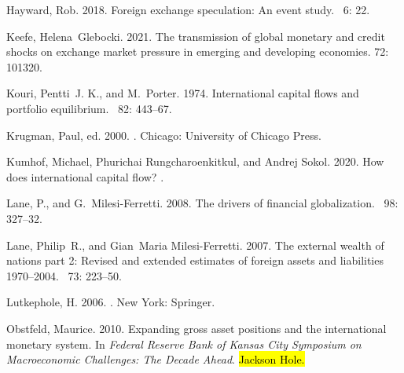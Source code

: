 \documentclass[jrfm,article,accept,moreauthors,pdftex]{Definitions/mdpi}
\begin{document}
\begin{thebibliography}{999}
Hayward, Rob. 2018.
\newblock Foreign exchange speculation: An event study.
~{6}: 22.

Keefe, Helena~Glebocki. 2021.
\newblock The transmission of global monetary and credit shocks on exchange
  market pressure in emerging and developing economies.
 72: 101320.

Kouri, Pentti~J. K., and M.~Porter. 1974.
\newblock International capital flows and portfolio equilibrium.
~{82}: 443--67.

Krugman, Paul, ed. 2000.
.
\newblock Chicago: University of Chicago Press.

Kumhof, Michael, Phurichai Rungcharoenkitkul, and Andrej Sokol. 2020.
\newblock How does international capital flow?
.%

Lane, P., and G.~Milesi-Ferretti. 2008.
\newblock The drivers of financial globalization.
~{98}: 327--32.

Lane, Philip~R., and Gian~Maria Milesi-Ferretti. 2007.
\newblock The external wealth of nations part 2: Revised and extended estimates
  of foreign assets and liabilities 1970--2004.
~{73}: 223--50.

Lutkephole, H. 2006.
.
\newblock New York: Springer.

Obstfeld, Maurice. 2010.
\newblock Expanding gross asset positions and the international monetary
  system.
\newblock In {\em Federal Reserve Bank of Kansas City Symposium on
  Macroeconomic Challenges: The Decade Ahead}.\hl{ Jackson Hole.} %



\end{thebibliography}
\end{document}
